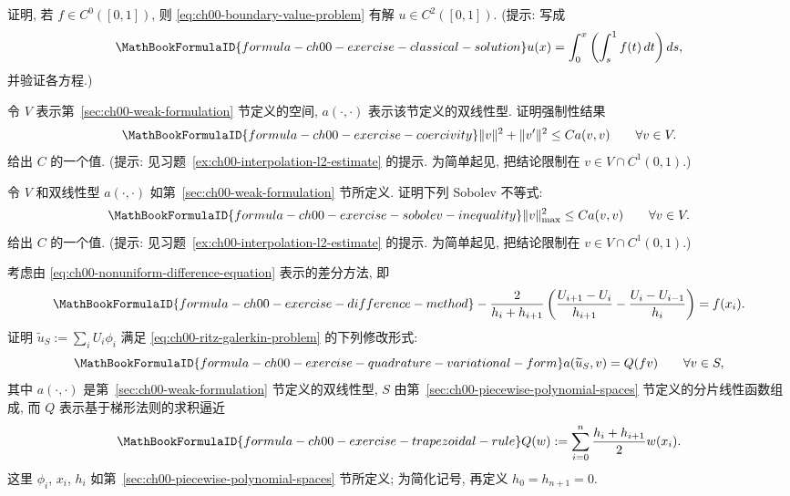 \begin{MBExercise}
\label{ex:ch00-classical-existence}
证明, 若 $f\in C^0([0,1])$, 则 \eqref{eq:ch00-boundary-value-problem} 有解 $u\in C^2([0,1])$. (提示: 写成
\[
\MathBookFormulaID{formula-ch00-exercise-classical-solution}
u(x)=\int_0^x\left(\int_s^1f(t)\,dt\right)ds,
\]
并验证各方程.)
\end{MBExercise}

\begin{MBExercise}
\label{ex:ch00-coercivity}
令 $V$ 表示第~\ref{sec:ch00-weak-formulation} 节定义的空间, $a(\cdot,\cdot)$ 表示该节定义的双线性型. 证明强制性结果
\[
\MathBookFormulaID{formula-ch00-exercise-coercivity}
\|v\|^2+\|v'\|^2\leq Ca(v,v)
\qquad\forall v\in V.
\]
给出 $C$ 的一个值. (提示: 见习题~\ref{ex:ch00-interpolation-l2-estimate} 的提示. 为简单起见, 把结论限制在 $v\in V\cap C^1(0,1)$.)
\end{MBExercise}

\begin{MBExercise}
\label{ex:ch00-sobolev-inequality}
令 $V$ 和双线性型 $a(\cdot,\cdot)$ 如第~\ref{sec:ch00-weak-formulation} 节所定义. 证明下列 Sobolev 不等式:
\[
\MathBookFormulaID{formula-ch00-exercise-sobolev-inequality}
\|v\|_{\max}^2\leq Ca(v,v)
\qquad\forall v\in V.
\]
给出 $C$ 的一个值. (提示: 见习题~\ref{ex:ch00-interpolation-l2-estimate} 的提示. 为简单起见, 把结论限制在 $v\in V\cap C^1(0,1)$.)
\end{MBExercise}

\begin{MBExercise}
\label{ex:ch00-difference-variational-form}
考虑由 \eqref{eq:ch00-nonuniform-difference-equation} 表示的差分方法, 即
\[
\MathBookFormulaID{formula-ch00-exercise-difference-method}
-\frac{2}{h_i+h_{i+1}}
\left(
\frac{U_{i+1}-U_i}{h_{i+1}}-
\frac{U_i-U_{i-1}}{h_i}
\right)=f(x_i).
\]
证明 $\widetilde u_S:=\sum_iU_i\phi_i$ 满足 \eqref{eq:ch00-ritz-galerkin-problem} 的下列修改形式:
\[
\MathBookFormulaID{formula-ch00-exercise-quadrature-variational-form}
a(\widetilde u_S,v)=Q(fv)
\qquad\forall v\in S,
\]
其中 $a(\cdot,\cdot)$ 是第~\ref{sec:ch00-weak-formulation} 节定义的双线性型, $S$ 由第~\ref{sec:ch00-piecewise-polynomial-spaces} 节定义的分片线性函数组成, 而 $Q$ 表示基于梯形法则的求积逼近
\[
\MathBookFormulaID{formula-ch00-exercise-trapezoidal-rule}
Q(w):=\sum_{i=0}^n\frac{h_i+h_{i+1}}2w(x_i).
\]
这里 $\phi_i$, $x_i$, $h_i$ 如第~\ref{sec:ch00-piecewise-polynomial-spaces} 节所定义; 为简化记号, 再定义 $h_0=h_{n+1}=0$.
\end{MBExercise}

